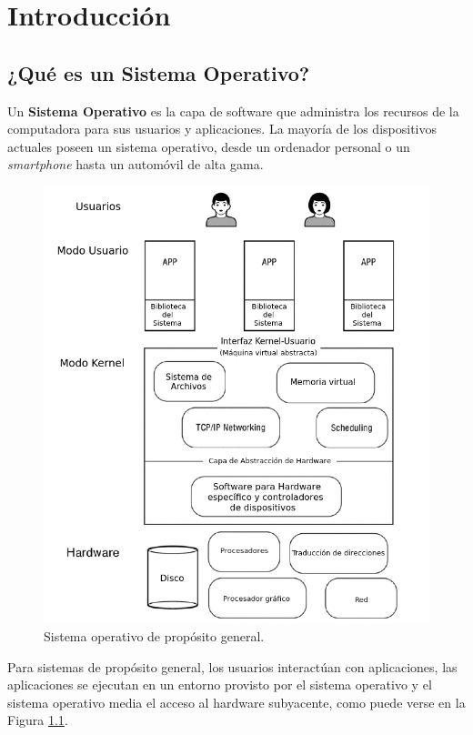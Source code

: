 \documentclass[10pt]{book}
\begin{document}
\chapter{Introducción}

\section{¿Qué es un Sistema Operativo?}
Un \textbf{Sistema Operativo} es la capa de software que administra los recursos de la computadora para sus usuarios y aplicaciones. La mayoría de los dispositivos actuales poseen un sistema operativo, desde un ordenador personal o un \textit{smartphone} hasta un automóvil de alta gama.

\begin{figure}[tbhp]
\centerline{\includegraphics[scale=0.70]{img/fig0101}}
\caption{Sistema operativo de propósito general.}
\label{fig0101}
\end{figure}

Para sistemas de propósito general, los usuarios interactúan con aplicaciones, las aplicaciones se ejecutan en un entorno provisto por el sistema operativo y el sistema operativo media el acceso al hardware subyacente, como puede verse en la Figura \ref{fig0101}.
\end{document}

